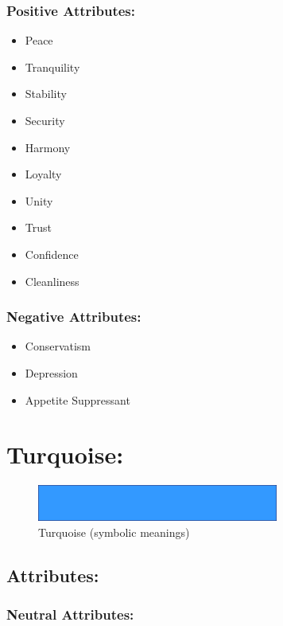 \documentclass[openleft,oneside,showtrims]{memoir}
\begin{document}
\subsubsection*{Positive Attributes:}
\label{sec:orgf7d6450}

\begin{itemize}
\item Peace
\item Tranquility
\item Stability
\item Security
\item Harmony
\item Loyalty
\item Unity
\item Trust
\item Confidence
\item Cleanliness
\end{itemize}

\subsubsection*{Negative Attributes:}
\label{sec:orgaf317d0}

\begin{itemize}
\item Conservatism
\item Depression
\item Appetite Suppressant
\end{itemize}

\section{Turquoise:}
\label{sec:org7285ef0}

\begin{figure}[htbp]
\centering
\includegraphics[width=300px]{./media/turquoise-banner.png}
\caption{\label{fig:HAP-WR-007}Turquoise (symbolic meanings)}
\end{figure}

\subsection{Attributes:}
\label{sec:orgb2d7907}

\subsubsection*{Neutral Attributes:}
\label{sec:org1b46a08}
\end{document}
